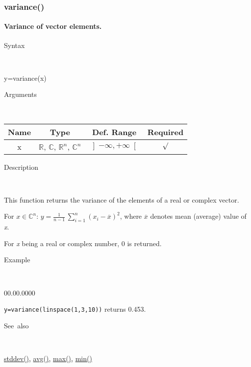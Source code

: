 \newpage
\subsubsection*{\hypertarget{variance}{}{\Large variance()}}


\paragraph{\label{par:Variance}Variance of vector elements.}

\begin{description}
\item [Syntax]~
\end{description}
y=variance(x)

\begin{description}
\item [Arguments]~
\end{description}
\begin{tabular}{|c|c|c|c|}
\hline 
Name&
Type&
Def. Range&
Required\tabularnewline
\hline
\hline 
x&
$\mathbb{R}$, $\mathbb{C}$, $\mathbb{R}^{n}$, $\mathbb{C}^{n}$&
$\left]-\infty,+\infty\right[$&
$\surd$\tabularnewline
\hline
\end{tabular}

\begin{description}
\item [Description]~
\end{description}
This function returns the variance of the elements of a real or complex
vector.

\medskip{}
For $x\in$$\mathbb{C}^{n}$: $y={\displaystyle \frac{1}{n-1}}\,$$\sum\limits _{i=1}^{n}\left(x_{i}-\overline{x}\right)^{2}$,
where $\overline{x}$ denotes mean (average) value of \textit{x}.
\medskip{}

For \textit{x} being a real or complex number, 0 is returned.

\begin{description}
\item [Example]~
\end{description}
\begin{lyxlist}{00.00.0000}
\item [\texttt{y=variance(linspace(1,3,10))}]returns 0.453.
\end{lyxlist}
\begin{description}
\item [See~also]~
\end{description}
\textcolor{blue}{\hyperlink{stddev}{stddev()}}\textcolor{black}{,}
\textcolor{blue}{\hyperlink{avg}{avg()}}\textcolor{black}{,} \textcolor{blue}{\hyperlink{max}{max()}}\textcolor{black}{,}
\textcolor{blue}{\hyperlink{min}{min()}}

